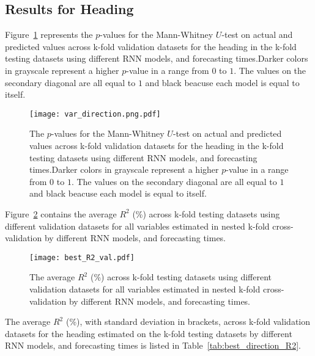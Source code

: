 \subsection{Results for Heading}

Figure~\ref{fig:var_direction.png} represents the $p$-values for the Mann-Whitney $U$-test on actual and predicted values across k-fold validation datasets for the heading in the k-fold testing datasets using different RNN models, and forecasting times.Darker colors in grayscale represent a higher $p$-value in a range from $0$ to $1$. The values on the secondary diagonal are all equal to $1$ and black beacuse each model is equal to itself.

\begin{figure}[!ht]
	\centering
	\texttt{[image: var\_direction.png.pdf]}
	\caption{The $p$-values for the Mann-Whitney $U$-test on actual and predicted values across k-fold validation datasets for the heading in the k-fold testing datasets using different RNN models, and forecasting times.Darker colors in grayscale represent a higher $p$-value in a range from $0$ to $1$. The values on the secondary diagonal are all equal to $1$ and black beacuse each model is equal to itself.}
	\label{fig:var_direction.png}
\end{figure}

Figure~\ref{fig:best_R2_val} contains the average $R^{2}$ (\%) across k-fold testing datasets using different validation datasets for all variables estimated in nested k-fold cross-validation by different RNN models, and forecasting times.

\begin{figure}[!ht]
	\centering
	\texttt{[image: best\_R2\_val.pdf]}
	\caption{The average $R^{2}$ (\%) across k-fold testing datasets using different validation datasets for all variables estimated in nested k-fold cross-validation by different RNN models, and forecasting times.}
	\label{fig:best_R2_val}
\end{figure}

The average $R^{2}$ (\%), with standard deviation in brackets, across k-fold validation datasets for the heading estimated on the k-fold testing datasets by different RNN models, and forecasting times is listed in Table~\ref{tab:best_direction_R2}.

